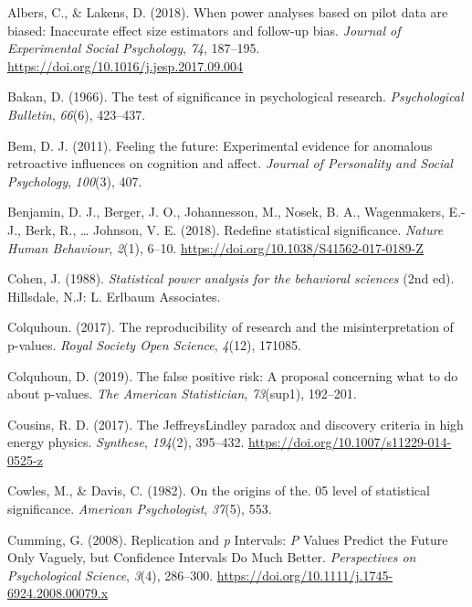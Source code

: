 \documentclass[
  english,
  ,jou,floatsintext]{apa6}
\newlength{\cslhangindent}
\newenvironment{cslreferences}%
  {\setlength{\parindent}{0pt}%
  \everypar{\setlength{\hangindent}{\cslhangindent}}\ignorespaces}%
  {\par}
\begin{document}
\hypertarget{refs}{}
\begin{cslreferences}
\leavevmode\hypertarget{ref-albers_when_2018}{}%
Albers, C., \& Lakens, D. (2018). When power analyses based on pilot data are biased: Inaccurate effect size estimators and follow-up bias. \emph{Journal of Experimental Social Psychology}, \emph{74}, 187--195. \url{https://doi.org/10.1016/j.jesp.2017.09.004}

\leavevmode\hypertarget{ref-bakan_test_1966}{}%
Bakan, D. (1966). The test of significance in psychological research. \emph{Psychological Bulletin}, \emph{66}(6), 423--437.

\leavevmode\hypertarget{ref-bem2011feeling}{}%
Bem, D. J. (2011). Feeling the future: Experimental evidence for anomalous retroactive influences on cognition and affect. \emph{Journal of Personality and Social Psychology}, \emph{100}(3), 407.

\leavevmode\hypertarget{ref-benjamin_redefine_2018}{}%
Benjamin, D. J., Berger, J. O., Johannesson, M., Nosek, B. A., Wagenmakers, E.-J., Berk, R., \ldots{} Johnson, V. E. (2018). Redefine statistical significance. \emph{Nature Human Behaviour}, \emph{2}(1), 6--10. \url{https://doi.org/10.1038/S41562-017-0189-Z}

\leavevmode\hypertarget{ref-cohen_statistical_1988}{}%
Cohen, J. (1988). \emph{Statistical power analysis for the behavioral sciences} (2nd ed). Hillsdale, N.J: L. Erlbaum Associates.

\leavevmode\hypertarget{ref-colquhoun2017reproducibility}{}%
Colquhoun. (2017). The reproducibility of research and the misinterpretation of p-values. \emph{Royal Society Open Science}, \emph{4}(12), 171085.

\leavevmode\hypertarget{ref-colquhoun2019false}{}%
Colquhoun, D. (2019). The false positive risk: A proposal concerning what to do about p-values. \emph{The American Statistician}, \emph{73}(sup1), 192--201.

\leavevmode\hypertarget{ref-cousins_jeffreyslindley_2017}{}%
Cousins, R. D. (2017). The JeffreysLindley paradox and discovery criteria in high energy physics. \emph{Synthese}, \emph{194}(2), 395--432. \url{https://doi.org/10.1007/s11229-014-0525-z}

\leavevmode\hypertarget{ref-cowles_origins_1982}{}%
Cowles, M., \& Davis, C. (1982). On the origins of the. 05 level of statistical significance. \emph{American Psychologist}, \emph{37}(5), 553.

\leavevmode\hypertarget{ref-cumming_replication_2008}{}%
Cumming, G. (2008). Replication and \emph{p} Intervals: \emph{P} Values Predict the Future Only Vaguely, but Confidence Intervals Do Much Better. \emph{Perspectives on Psychological Science}, \emph{3}(4), 286--300. \url{https://doi.org/10.1111/j.1745-6924.2008.00079.x}


\end{cslreferences}
\end{document}
